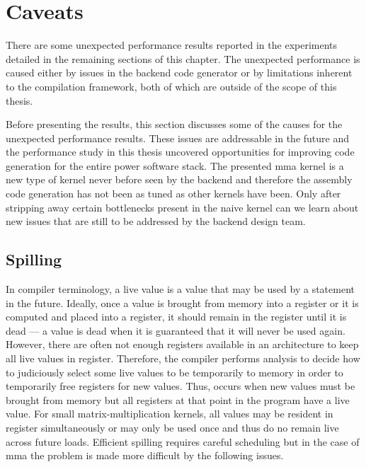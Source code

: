\documentclass[\main/thesis.tex]{subfiles}
\begin{document}
\section{Caveats}
\label{sec:caveats}
There are some unexpected performance results reported in the experiments detailed in the remaining sections of this chapter.
The unexpected performance is caused either by issues in the backend code generator or by limitations inherent to the compilation framework, both of which are outside of the scope of this thesis.

Before presenting the results, this section discusses some of the causes for the unexpected performance results.
These issues are addressable in the future and the performance study in this thesis uncovered opportunities for improving code generation for the entire \gls{power} software stack.
The presented \gls{mma} kernel is a new type of kernel never before seen by the backend and therefore the assembly code generation has not been as tuned as other kernels have been.
Only after stripping away certain bottlenecks present in the naive kernel can we learn about new issues that are still to be addressed by the backend design team.

\subsection{Spilling}
In compiler terminology, a \gls{live} value is a value that may be used by a statement in the future.
Ideally, once a value is brought from memory into a register or it is computed and placed into a register, it should remain in the register until it is \gls{dead} --- a value is dead when it is guaranteed that it will never be used again.
However, there are often not enough registers available in an architecture to keep all live values in register.
Therefore, the compiler performs analysis to decide how to judiciously select some live values to be temporarily  to memory in order to temporarily free registers for new values.
Thus,  occurs when new values must be brought from memory but all registers at that \gls{point} in the program have a \gls{live} value.
For small matrix-multiplication kernels, all values may be resident in register simultaneously or may only be used once and thus do no remain \gls{live} across future loads.
Efficient spilling requires careful scheduling but in the case of \gls{mma} the problem is made more difficult by the following issues.
\end{document}
